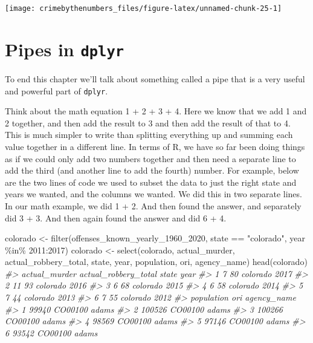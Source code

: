 \documentclass[
]{krantz}
\makeatletter
\newenvironment{Shaded}{\begin{snugshade}}{\end{snugshade}}
\newcommand{\CommentTok}[1]{\textcolor[rgb]{0.37,0.37,0.37}{\textit{#1}}}
\newcommand{\DecValTok}[1]{\textcolor[rgb]{0.06,0.06,0.06}{#1}}
\newcommand{\FunctionTok}[1]{\textcolor[rgb]{0,0,0}{#1}}
\newcommand{\NormalTok}[1]{#1}
\newcommand{\OtherTok}[1]{\textcolor[rgb]{0.37,0.37,0.37}{#1}}
\newcommand{\SpecialCharTok}[1]{\textcolor[rgb]{0,0,0}{#1}}
\newcommand{\StringTok}[1]{\textcolor[rgb]{0.5,0.5,0.5}{#1}}
\newenvironment{kframe}{%
\medskip{}
\setlength{\fboxsep}{.8em}
 \def\at@end@of@kframe{}%
 \ifinner\ifhmode%
  \def\at@end@of@kframe{\end{minipage}}%
  \begin{minipage}{\columnwidth}%
 \fi\fi%
 \def\FrameCommand##1{\hskip\@totalleftmargin \hskip-\fboxsep
 \colorbox{shadecolor}{##1}\hskip-\fboxsep
     \hskip-\linewidth \hskip-\@totalleftmargin \hskip\columnwidth}%
 \MakeFramed {\advance\hsize-\width
   \@totalleftmargin\z@ \linewidth\hsize
   \@setminipage}}%
 {\par\unskip\endMakeFramed%
 \at@end@of@kframe}
\renewenvironment{Shaded}{\begin{kframe}}{\end{kframe}}
\makeatother
\begin{document}
\begin{center}\texttt{[image: crimebythenumbers\_files/figure-latex/unnamed-chunk-25-1]} \end{center}

\hypertarget{dplyr-pipes}{%
\section{\texorpdfstring{Pipes in \texttt{dplyr}}{Pipes in dplyr}}\label{dplyr-pipes}}

To end this chapter we'll talk about something called a pipe that is a very useful and powerful part of \texttt{dplyr}.

Think about the math equation 1 + 2 + 3 + 4. Here we know that we add 1 and 2 together, and then add the result to 3 and then add the result of that to 4. This is much simpler to write than splitting everything up and summing each value together in a different line. In terms of R, we have so far been doing things as if we could only add two numbers together and then need a separate line to add the third (and another line to add the fourth) number. For example, below are the two lines of code we used to subset the data to just the right state and years we wanted, and the columns we wanted. We did this in two separate lines. In our math example, we did 1 + 2. And then found the answer, and separately did 3 + 3. And then again found the answer and did 6 + 4.

\begin{Shaded}
\begin{Highlighting}[]
\NormalTok{colorado }\OtherTok{\textless{}{-}} \FunctionTok{filter}\NormalTok{(offenses\_known\_yearly\_1960\_2020, state }\SpecialCharTok{==} \StringTok{"colorado"}\NormalTok{, year }\SpecialCharTok{\%in\%} \DecValTok{2011}\SpecialCharTok{:}\DecValTok{2017}\NormalTok{)}
\NormalTok{colorado }\OtherTok{\textless{}{-}} \FunctionTok{select}\NormalTok{(colorado, actual\_murder, actual\_robbery\_total, state, year, population, ori, agency\_name)}
\FunctionTok{head}\NormalTok{(colorado)}
\CommentTok{\#\textgreater{}   actual\_murder actual\_robbery\_total    state year}
\CommentTok{\#\textgreater{} 1             7                   80 colorado 2017}
\CommentTok{\#\textgreater{} 2            11                   93 colorado 2016}
\CommentTok{\#\textgreater{} 3             6                   68 colorado 2015}
\CommentTok{\#\textgreater{} 4             6                   58 colorado 2014}
\CommentTok{\#\textgreater{} 5             7                   44 colorado 2013}
\CommentTok{\#\textgreater{} 6             7                   55 colorado 2012}
\CommentTok{\#\textgreater{}   population     ori agency\_name}
\CommentTok{\#\textgreater{} 1      99940 CO00100       adams}
\CommentTok{\#\textgreater{} 2     100526 CO00100       adams}
\CommentTok{\#\textgreater{} 3     100266 CO00100       adams}
\CommentTok{\#\textgreater{} 4      98569 CO00100       adams}
\CommentTok{\#\textgreater{} 5      97146 CO00100       adams}
\CommentTok{\#\textgreater{} 6      93542 CO00100       adams}
\end{Highlighting}
\end{Shaded}
\end{document}
